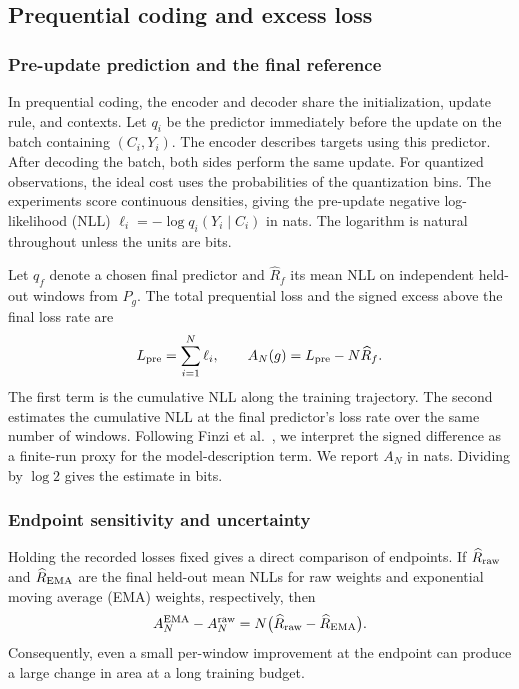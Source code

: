 \documentclass[10pt,a4paper]{article}
\theoremstyle{definition}
\begin{document}
\subsection{Prequential coding and excess loss}\label{sec:prequential}

\subsubsection{Pre-update prediction and the final reference}
In prequential coding, the encoder and decoder share the initialization,
update rule, and contexts. Let $q_i$ be the predictor immediately before
the update on the batch containing $(C_i,Y_i)$. The encoder describes targets
using this predictor. After decoding the batch, both sides perform the same
update. For quantized observations, the ideal cost uses the probabilities of
the quantization bins. The experiments score continuous densities, giving
the pre-update negative log-likelihood (NLL) $\ell_i=-\log q_i(Y_i\mid C_i)$
in nats. The logarithm is natural throughout unless the units are bits.

Let $q_f$ denote a chosen final predictor and $\widehat R_f$ its mean NLL on
independent held-out windows from $P_g$. The total prequential loss and the
signed excess above the final loss rate are
\begin{equation}
 L_{\rm pre}=\sum_{i=1}^{N}\ell_i,\qquad
 A_N(g)=L_{\rm pre}-N\widehat R_f.
 \label{eq:area}
\end{equation}
The first term is the cumulative NLL along the training trajectory. The
second estimates the cumulative NLL at the final predictor's loss rate
over the same number of windows. Following Finzi
et al.~\cite{finzi2026}, we interpret the signed difference as a finite-run
proxy for the model-description term. We report $A_N$ in nats. Dividing
by $\log 2$ gives the estimate in bits.

\subsubsection{Endpoint sensitivity and uncertainty}
Holding the recorded losses fixed gives a direct comparison of endpoints.
If $\widehat R_{\rm raw}$ and $\widehat R_{\rm EMA}$ are the final held-out
mean NLLs for raw weights and exponential moving average (EMA) weights,
respectively, then
\begin{equation}
 A_N^{\rm EMA}-A_N^{\rm raw}
 =N\bigl(\widehat R_{\rm raw}-\widehat R_{\rm EMA}\bigr).
\label{eq:endpoint-effect}
\end{equation}
Consequently, even a small per-window improvement at the endpoint can
produce a large change in area at a long training budget.
\end{document}
